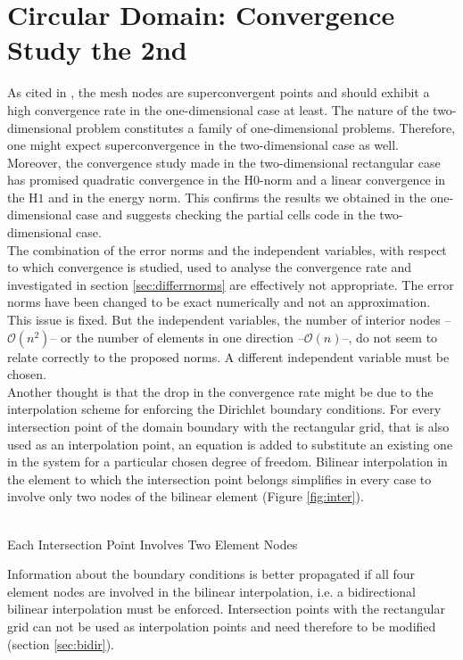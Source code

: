 \documentclass[a4paper,12pt]{article}
\makeatletter
\newenvironment{figurehere}
  {\def\@captype{figure}}
  {}
\makeatother
\begin{document}
\section{Circular Domain: Convergence Study the 2nd}
As cited in \cite{TaylorZienkiewicz}, the mesh nodes are superconvergent points and should exhibit a high convergence rate in the one-dimensional case at least. The nature of the two-dimensional problem constitutes a family of one-dimensional problems. Therefore, one might expect superconvergence in the two-dimensional case as well. Moreover, the convergence study made in the two-dimensional rectangular case has promised quadratic convergence in the H$0$-norm and a linear convergence in the H$1$ and in the energy norm. This confirms the results we obtained in the one-dimensional case and suggests checking the partial cells code in the two-dimensional case.\\
The combination of the error norms and the independent variables, with respect to which convergence is studied, used to analyse the convergence rate and investigated in section \ref{sec:differrnorms} are effectively not appropriate. The error norms have been changed to be exact numerically and not an approximation. This issue is fixed. But the independent variables, the number of interior nodes --$\mathcal{O}(n^2)$-- or the number of elements in one direction --$\mathcal{O}(n)$--, do not seem to relate correctly to the proposed norms. A different independent variable must be chosen. \\
Another thought is that the drop in the convergence rate might be due to the interpolation scheme for enforcing the Dirichlet boundary conditions. For every intersection point of the domain boundary with the rectangular grid, that is also used as an interpolation point, an equation is added to substitute an existing one in the system for a particular chosen degree of freedom. Bilinear interpolation in the element to which the intersection point belongs simplifies in every case to involve only two nodes of the bilinear element (Figure \ref{fig:inter}).
\begin{center}
\begin{figurehere}
\\
\caption{Each Intersection Point Involves Two Element Nodes}\label{fig:inter}
\end{figurehere}
\end{center}
Information about the boundary conditions is better propagated if all four element nodes are involved in the bilinear interpolation, i.e. a bidirectional bilinear interpolation must be enforced. Intersection points with the rectangular grid can not be used as interpolation points and need therefore to be modified (section \ref{sec:bidir}).\\
\end{document}
